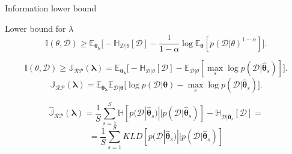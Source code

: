 \documentclass{beamer}
\begin{document}
\begin{frame}{Information lower bound}
\centering
\begin{block}{Lower bound for $\lambda$} 
    \begin{equation}
        \mathbb{I}(\theta, \mathcal{D}) \geq \mathbb{E}_{\boldsymbol{\theta}_{\boldsymbol{\lambda}}}\Big[ -\mathbb{H}_{\mathcal{D}|\theta}[\mathcal{D}] - \frac{1}{1 - \alpha} \log \mathbb{E}_{\boldsymbol{\theta}}[p(\mathcal{D}|\theta)^{1 - \alpha}]\Big].
    \end{equation}

    \begin{equation}
    \mathbb{I}(\theta, \mathcal{D}) \geq \mathbb{J}_{\mathcal{RP}}(\boldsymbol{\lambda}) = \mathbb{E}_{\boldsymbol{\theta}_{\boldsymbol{\lambda}}}\Big[-\mathbb{H}_{\mathcal{D}|\theta}[\mathcal{D}] - \mathbb{E}_{\mathcal{D}|\theta}[\displaystyle \max_s \log p(\mathcal{D}|\boldsymbol{\hat{\theta}}_{s})]\Big].
    \end{equation}
    \begin{equation}
    \mathbb{J}_{\mathcal{RP}}(\boldsymbol{\lambda}) = \mathbb{E}_{\boldsymbol{\theta}_{\boldsymbol{\lambda}}} \mathbb{E}_{\mathcal{D}|\boldsymbol{\theta}} \Big[\log p(\mathcal{D}|\boldsymbol{\theta}) - \displaystyle \max_s \log p(\mathcal{D}|\boldsymbol{\hat{\theta}}_{s})\Big].
    \end{equation}
    
    \[\mathbb{\hat{J}}_{\mathcal{RP}}(\boldsymbol{\lambda})= \frac{1}{S}\sum^{S}_{s=1} \mathbb{H}[p(\mathcal{D}|\boldsymbol{\hat{\theta}}_{s})||p(\mathcal{D}|\boldsymbol{\hat{\theta}}_{s})] - \mathbb{H}_{\mathcal{D}|\boldsymbol{\hat{\theta}}_{s}}[\mathcal{D}] = \]
    \begin{equation}
     = \frac{1}{S} \sum^{S}_{s=1} KLD[p(\mathcal{D}|\boldsymbol{\hat{\theta}}_{s})||p(\mathcal{D}|\boldsymbol{\hat{\theta}}_{s})]
    \end{equation}
    \end{block} 
  
\end{frame}
\end{document}
